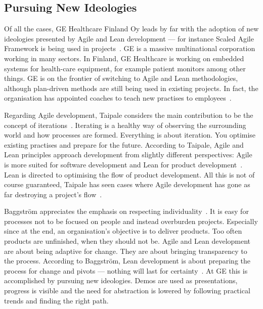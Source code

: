 \documentclass[english]{tktltiki2}
\begin{document}
\subsection{Pursuing New Ideologies}

Of all the cases, GE Healthcare Finland Oy leads by far with the adoption of new ideologies presented by Agile and Lean development — for instance Scaled Agile Framework is being used in projects~\cite{BT15}. GE is a massive multinational corporation working in many sectors. In Finland, GE Healthcare is working on embedded systems for health-care equipment, for example patient monitors among other things. GE is on the frontier of switching to Agile and Lean methodologies, although plan-driven methods are still being used in existing projects. In fact, the organisation has appointed coaches to teach new practises to employees~\cite{BT15}.

Regarding Agile development, Taipale considers the main contribution to be the concept of iterations~\cite{BT15}. Iterating is a healthy way of observing the surrounding world and how processes are formed. Everything is about iteration. You optimise existing practises and prepare for the future. According to Taipale, Agile and Lean principles approach development from slightly different perspectives: Agile is more suited for software development and Lean for product development~\cite{BT15}. Lean is directed to optimising the flow of product development. All this is not of course guaranteed, Taipale has seen cases where Agile development has gone as far destroying a project’s flow~\cite{BT15}.

Baggström appreciates the emphasis on respecting individuality~\cite{BT15}. It is easy for processes not to be focused on people and instead overburden projects. Especially since at the end, an organisation’s objective is to deliver products. Too often products are unfinished, when they should not be. Agile and Lean development are about being adaptive for change. They are about bringing transparency to the process. According to Baggström, Lean development is about preparing the process for change and pivots — nothing will last for certainty~\cite{BT15}. At GE this is accomplished by pursuing new ideologies. Demos are used as presentations, progress is visible and the need for abstraction is lowered by following practical trends and finding the right path.
\end{document}
